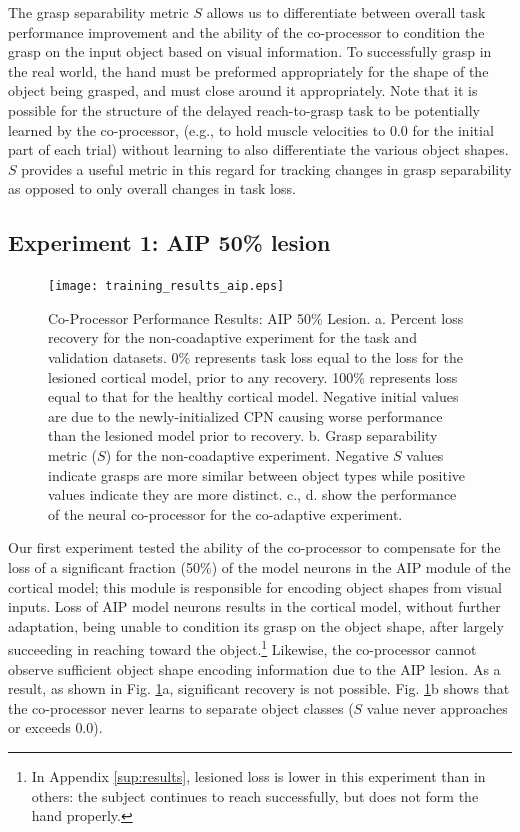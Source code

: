 \documentclass[12pt]{iopart}
\begin{document}
The grasp separability metric $S$ allows us to differentiate between overall task performance improvement
and the ability of the co-processor to condition the grasp on the input object based on visual information.
To successfully grasp in the real world, the hand must be preformed appropriately for
the shape of the object being grasped, and must close around it appropriately.
Note that it is possible for the structure of the delayed reach-to-grasp task to be potentially learned
by the co-processor, (e.g., to hold muscle velocities to 0.0 for the initial part of each trial) without
learning to also differentiate the various object shapes. $S$ provides a useful metric in this regard for
tracking changes in grasp separability as opposed to only overall changes in task loss.

\subsection{Experiment 1: AIP 50\% lesion}
\begin{figure}[h]
\centering
\texttt{[image: training\_results\_aip.eps]}
\caption{Co-Processor Performance Results: AIP 50\% Lesion. a. Percent loss recovery for the non-coadaptive
         experiment for the task and validation datasets. 0\% represents task loss equal to the loss for the
         lesioned cortical model, prior to any recovery. 100\% represents loss equal to that for the healthy
         cortical model. Negative initial values are due to the newly-initialized CPN causing
         worse performance than the lesioned model prior to recovery. b. Grasp separability metric ($S$) for the non-coadaptive
         experiment. Negative $S$ values indicate grasps are more similar between object types while 
         positive values indicate they are more distinct. c., d. show the performance of the neural co-processor for the
         co-adaptive experiment.}
\label{fig:results_aip}
\end{figure}

Our first experiment tested the ability of the co-processor to compensate for the loss of a significant
fraction (50\%) of the model neurons in the AIP module of the cortical model; this module is responsible for encoding
object shapes from visual inputs. Loss of AIP model neurons results in the cortical model, without further adaptation,
being unable to condition its grasp on the object shape, after largely succeeding in reaching toward the object.\footnote{
In Appendix \ref{sup:results}, lesioned loss is lower in this experiment than in others: the subject
continues to reach successfully, but does not form the hand properly.} Likewise, the co-processor cannot observe sufficient
object shape encoding information due to the AIP lesion. As a result, as shown in Fig. \ref{fig:results_aip}a, significant
recovery is not possible. Fig. \ref{fig:results_aip}b shows that the co-processor never learns to separate object classes
($S$ value never approaches or exceeds $0.0$).
\end{document}
